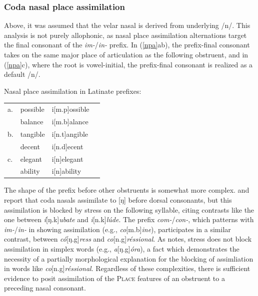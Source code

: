 \subsubsection{Coda nasal place assimilation}
\label{cnpasection}

Above, it was assumed that the velar nasal is derived from underlying /n/. 
This analysis is not purely allophonic, as nasal place assimilation alternations target the final consonant of the \emph{im-}/\emph{in-} prefix. In (\ref{npa}ab), the prefix-final consonant takes on the same major place of articulation as the following obstruent, and in (\ref{npa}c), where the root is vowel-initial, the prefix-final consonant is realized as a default /n/.

\begin{example}
\label{npa}
Nasal place assimilation in Latinate prefixes:

\vspace{0.5\baselineskip}
\begin{tabular}{l l l l}
a. & possible & i[m.p]ossible \\
   & balance  & i[m.b]alance  \\
b. & tangible & i[n.t]angible \\
   & decent   & i[n.d]ecent   \\
c. & elegant  & i[n]elegant  \\
   & ability  & i[n]ability  \\
\end{tabular} 
\end{example}

\noindent
The shape of the prefix before other obstruents is somewhat more complex. 
\citet[][62]{Halle1985a} and \citet[][90]{Borowsky1986} report that coda nasals assimilate to [ŋ] before dorsal consonants, but this assimilation is blocked by stress on the following syllable, citing contrasts like the one between \emph{í}[ŋ.k]\emph{ubate} and \emph{i}[n.k]\emph{lúde}. The prefix \emph{com-}/\emph{con-}, which patterns with \emph{im-}/\emph{in-} in showing assimilation (e.g., \emph{co}[m.b]\emph{ine}), participates in a similar contrast, between \emph{có}[ŋ.g]\emph{ress} and \emph{co}[n.g]\emph{réssional}. As \citeauthor{Borowsky1986} notes, stress does not block assimilation in simplex words (e.g., \emph{a}[ŋ.g]\emph{óra}), a fact which demonstrates the necessity of a partially morphological explanation for the blocking of assimliation in words like \emph{co}[n.g]\emph{réssional}. Regardless of these complexities, there is sufficient evidence to posit assimilation of the \textsc{Place} features of an obstruent to a preceding nasal consonant. 

